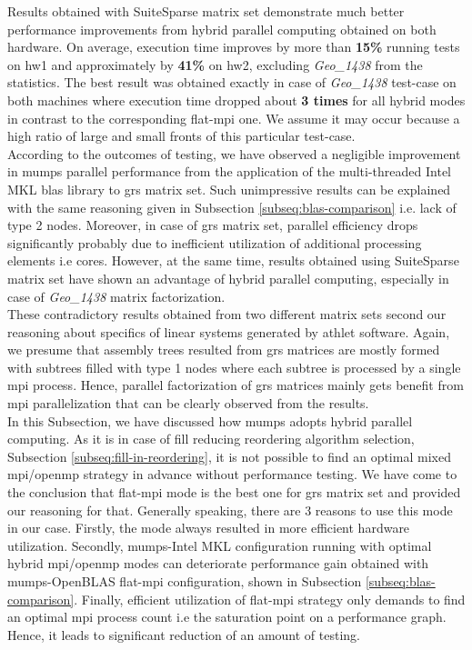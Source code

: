 Results obtained with SuiteSparse matrix set demonstrate much better performance improvements from hybrid parallel computing obtained on both hardware. On average, execution time improves by more than \textbf{15\%} running tests on \gls{hw1} and approximately by \textbf{41\%} on \gls{hw2}, excluding \textit{Geo\_1438} from the statistics. The best result was obtained exactly in case of \textit{Geo\_1438} test-case on both machines where execution time dropped about \textbf{3 times} for all hybrid modes in contrast to the corresponding flat-\acrshort{mpi} one. We assume it may occur because a high ratio of large and small fronts of this particular test-case.\\


According to the outcomes of testing, we have observed a negligible improvement in \acrshort{mumps} parallel performance from the application of the multi-threaded Intel MKL \acrshort{blas} library to \acrshort{grs} matrix set. Such unimpressive results can be explained with the same reasoning given in Subsection \ref{subseq:blas-comparison} i.e. lack of type 2 nodes. Moreover, in case of \acrshort{grs} matrix set, parallel efficiency drops significantly probably due to inefficient utilization of additional processing elements i.e cores. However, at the same time, results obtained using SuiteSparse matrix set have shown an advantage of hybrid parallel computing, especially in case of \textit{Geo\_1438} matrix factorization.\\


These contradictory results obtained from two different matrix sets second our reasoning about specifics of linear systems generated by \acrshort{athlet} software. Again, we presume that assembly trees resulted from \acrshort{grs} matrices are mostly formed with subtrees filled with type 1 nodes where each subtree is processed by a single \acrshort{mpi} process. Hence, parallel factorization of \acrshort{grs} matrices mainly gets benefit from \acrshort{mpi} parallelization that can be clearly observed from the results.\\



In this Subsection, we have discussed how \acrshort{mumps} adopts hybrid parallel computing. As it is in case of fill reducing reordering algorithm selection, Subsection \ref{subseq:fill-in-reordering}, it is not possible to find an optimal mixed \acrshort{mpi}/\acrshort{openmp} strategy in advance without performance testing. We have come to the conclusion that flat-\acrshort{mpi} mode is the best one for \acrshort{grs} matrix set and provided our reasoning for that. Generally speaking, there are 3 reasons to use this mode in our case. Firstly, the mode always resulted in more efficient hardware utilization. Secondly,  \acrshort{mumps}-Intel MKL configuration running with optimal hybrid \acrshort{mpi}/\acrshort{openmp} modes can deteriorate performance gain obtained with \acrshort{mumps}-OpenBLAS flat-\acrshort{mpi} configuration, shown in Subsection \ref{subseq:blas-comparison}. Finally, efficient utilization of flat-\acrshort{mpi} strategy only demands to find an optimal \acrshort{mpi} process count i.e the saturation point on a performance graph. Hence, it leads to significant reduction of an amount of testing. \\
